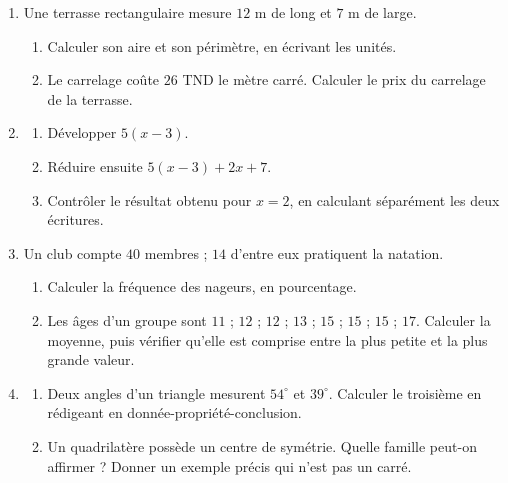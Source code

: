 \documentclass[10pt,a4paper]{article}
\begin{document}
\begin{enumerate}
\needspace{22mm}
\item[\textbf{B1.}] Une terrasse rectangulaire mesure $12$ m de long et $7$ m de large.
\begin{enumerate}
\item Calculer son aire et son périmètre, en écrivant les unités.
\item Le carrelage coûte $26$ TND le mètre carré. Calculer le prix du carrelage de la terrasse.
\end{enumerate}
\par\vspace{1.2mm}
\needspace{22mm}
\item[\textbf{B2.}] \begin{enumerate}
\item Développer $5(x - 3)$.
\item Réduire ensuite $5(x - 3) + 2x + 7$.
\item Contrôler le résultat obtenu pour $x = 2$, en calculant séparément les deux écritures.
\end{enumerate}
\par\vspace{1.2mm}
\needspace{22mm}
\item[\textbf{B3.}] Un club compte $40$ membres ; $14$ d'entre eux pratiquent la natation.
\begin{enumerate}
\item Calculer la fréquence des nageurs, en pourcentage.
\item Les âges d'un groupe sont $11$ ; $12$ ; $12$ ; $13$ ; $15$ ; $15$ ; $15$ ; $17$.
Calculer la moyenne, puis vérifier qu'elle est comprise entre la plus petite et la plus grande valeur.
\end{enumerate}
\par\vspace{1.2mm}
\needspace{22mm}
\item[\textbf{B4.}] \begin{enumerate}
\item Deux angles d'un triangle mesurent $54^\circ$ et $39^\circ$. Calculer le troisième en rédigeant
en donnée-propriété-conclusion.
\item Un quadrilatère possède un centre de symétrie. Quelle famille peut-on affirmer ?
Donner un exemple précis qui n'est pas un carré.
\end{enumerate}
\par\vspace{1.2mm}
\end{enumerate}
\end{document}
